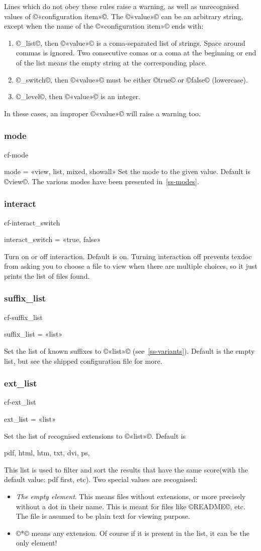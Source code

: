 \documentclass[a4paper, oneside]{scrartcl}
\makeatletter
\newif\ifframed
\newenvironment{cmdsubsub}[2]{%
  \framedfalse \commandes\subsubsection{#1}{#2}%
  }{%
  \endcommandes}
\newenvironment{htcode}{%
  \SaveVerbatim[samepage, gobble=2]{verbmat}%
  }{%
  \endSaveVerbatim
  \par\medskip\noindent\hspace*{\parindent}%
  \BUseVerbatim{verbmat}%
  \par\medskip\@endpetrue}
\makeatother
\begin{document}
Lines which do not obey these rules raise a warning, as well as unrecognised
values of ©«configuration item»©. The ©«value»© can be an arbitrary string,
except when the name of the ©«configuration item»© ends with:
\begin{enumerate}
  \item ©_list©, then ©«value»© is a coma-separated list of strings. Space
    around commas is ignored. Two consecutive comas or a coma at the beginning
    or end of the list means the empty string at the corresponding place.
  \item ©_switch©, then ©«value»© must be either ©true© or ©false©
    (lowercase).
  \item ©_level©, then ©«value»© is an integer.
\end{enumerate}
In these cases, an improper ©«value»© will raise a warning too.

\begin{cmdsubsub}{mode}{cf-mode}
  mode = «view, list, mixed, showall»
\end{cmdsubsub}
Set the  mode to the given value.  Default is ©view©. The various modes
have been presented in~\ref{ss-modes}.

\begin{cmdsubsub}{interact}{cf-interact_switch}
  interact_switch = «true, false»
\end{cmdsubsub}

Turn on or off interaction.  Default is on.  Turning interaction off prevents
texdoc from asking you to choose a file to view when there are multiple
choices, so it just prints the list of files found.

\begin{cmdsubsub}{suffix_list}{cf-suffix_list}
  suffix_list = «list»
\end{cmdsubsub}

Set the list of known suffixes to ©«list»© (see~\ref{ss-variants}). Default is
the empty list, but see the shipped configuration file for more.

\begin{cmdsubsub}{ext_list}{cf-ext_list}
  ext_list = «list»
\end{cmdsubsub}

Set the list of recognised extensions to ©«list»©.  Default is
\begin{htcode}
  pdf, html, htm, txt, dvi, ps,
\end{htcode}
This list is used to filter and  sort the results that have the same
score(with the default value: pdf first, etc).  Two special values are
recognised:
\begin{itemize}
  \item \emph{The empty element}. This means files without extensions, or more
    precisely without a dot in their name.  This is meant for files like
    ©README©, etc.  The file is assumed to be plain text for viewing purpose.
  \item ©*© means any extension.  Of course if it is present in the list, it
    can be the only element!
\end{itemize}
\end{document}

